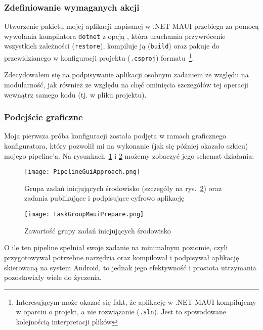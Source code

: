 \subsubsection{Zdefiniowanie wymaganych akcji}
Utworzenie pakietu mojej aplikacji napisanej w .NET MAUI przebiega za pomocą wywołania kompilatora 
\verb|dotnet| z opcją , 
która uruchamia przywrócenie wszystkich zależności (\verb|restore|), 
kompiluje ją (\verb|build|) oraz pakuje do przewidzianego w konfiguracji projektu (\verb|.csproj|) formatu~\cprotect\footnote{%
    Interesującym może okazać się fakt, że aplikację w .NET MAUI kompilujemy w oparciu o projekt, a nie rozwiązanie (\verb|.sln|).
    Jest to spowodowane kolejnością interpretacji plików
}.

Zdecydowałem się na podpisywanie aplikacji osobnym zadaniem ze względu na modularność,
jak również ze względu na chęć ominięcia szczegółów tej operacji wewnątrz samego kodu (tj. w pliku projektu).

\subsubsection{Podejście graficzne}
Moja pierwsza próba konfiguracji została podjęta w ramach graficznego konfiguratora, 
który pozwolił mi na wykonanie (jak się później okazało szkicu) mojego pipeline'a.
Na rysunkach~\ref{img:PipelineGuiApproach} i \ref{img:taskGroupMauiPrepare} możemy zobaczyć jego schemat działania:\\
\begin{figure}
    \centering
    \texttt{[image: PipelineGuiApproach.png]}
    \caption{Grupa zadań inicjujących środowisko (szczegóły na rys.~\ref{img:taskGroupMauiPrepare}) oraz zadania publikujące i podpisujące cyfrowo aplikację}
    \label{img:PipelineGuiApproach}
\end{figure}
\begin{figure}
    \centering
    \texttt{[image: taskGroupMauiPrepare.png]}
    \caption{Zawartość grupy zadań inicjujących środowisko}
    \label{img:taskGroupMauiPrepare}
\end{figure}

\newpage

O ile ten pipeline spełniał swoje zadanie na minimalnym poziomie, czyli przygotowywał potrzebne narzędzia 
oraz kompilował i podpisywał aplikację skierowaną na system Android, to jednak jego efektywność i prostota 
utrzymania pozostawiały wiele do życzenia.

